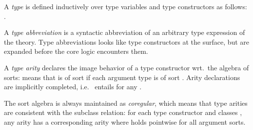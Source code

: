 \begin{isabellebody}
\begin{isamarkuptext}
  A \emph{type} is defined inductively over type variables and type
  constructors as follows: .

  A \emph{type abbreviation} is a syntactic abbreviation of an
  arbitrary type expression of the theory.  Type abbreviations looks
  like type constructors at the surface, but are expanded before the
  core logic encounters them.

  A \emph{type arity} declares the image behavior of a type
  constructor wrt.\ the algebra of sorts:  means that  is
  of sort  if each argument type  is of
  sort .  Arity declarations are implicitly
  completed, i.e.\  entails  for any .

  \medskip The sort algebra is always maintained as \emph{coregular},
  which means that type arities are consistent with the subclass
  relation: for each type constructor  and classes , any arity  has a corresponding arity  where  holds pointwise for all argument sorts.


\end{isamarkuptext}
\end{isabellebody}
